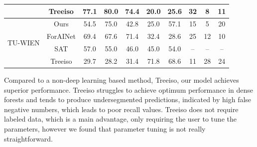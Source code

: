\documentclass[review,authoryear]{elsarticle}
\begin{document}
\begin{table}[ht!]
{\begin{tabular}{c|c|c|c|c|c|c|c|c|c}
         & Treeiso & 77.1 & 80.0 & 74.4 & 20.0 & 25.6 & 32 & 8 & 11 \\
        \hline
        \multirow{4}{*}{TU-WIEN} & Ours & 54.5 & 75.0 & 42.8 & 25.0 & 57.1 & 15 & 5 & 20 \\
         & ForAINet & 69.4 & 67.6 & 71.4 & 32.4 & 28.6 & 25 & 12 & 10 \\
         & SAT & 57.0 & 55.0 & 46.0 & 45.0 & 54.0 & -- & -- & -- \\
         & Treeiso & 29.7 & 28.2 & 31.4 & 71.8 & 68.6 & 11 & 28 & 24 \\
        \hline
    \end{tabular}}
    \label{tab:insseg_all_comp}
\end{table}

Compared to a non-deep learning based method, Treeiso, our model achieves superior performance. Treeiso struggles to achieve optimum performance in dense forests and tends to produce undersegmented predictions, indicated by high false negative numbers, which leads to poor recall values. Treeiso does not require labeled data, which is a main advantage, only requiring the user to tune the parameters, however we found that parameter tuning is not really straightforward.
\end{document}
